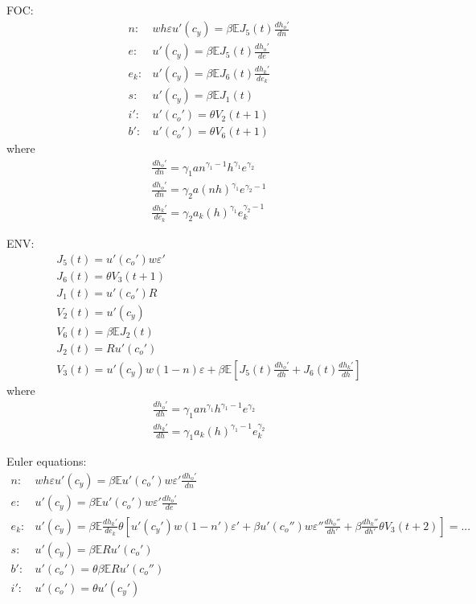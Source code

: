\documentclass{article}
\newcommand{\E}{\mathbb{E}}
\begin{document}
\begin{enumerate}
FOC:
\begin{eqnarray*}
  n:&wh\varepsilon u'(c_y)=\beta\E J_5(t)\frac{dh_o'}{dn}\\
  e:&u'(c_y)=\beta\E J_5(t)\frac{dh_o'}{de}\\
  e_k:&u'(c_y)=\beta\E J_6(t)\frac{dh_k'}{de_k}\\
  s:&u'(c_y)=\beta\E J_1(t)\\
  i':&u'(c_o')=\theta V_2(t+1)\\
  b':&u'(c_o')=\theta V_6(t+1)
\end{eqnarray*}
where
\begin{eqnarray*}
  \frac{dh_o'}{dn}=\gamma_1an^{\gamma_1-1}h^{\gamma_1}e^{\gamma_2}\\
  \frac{dh_o'}{dn}=\gamma_2a(nh)^{\gamma_1}e^{\gamma_2-1}\\
  \frac{dh_k'}{de_k}=\gamma_2a_k(h)^{\gamma_1}e_k^{\gamma_2-1}
\end{eqnarray*}

ENV:
\begin{eqnarray*}
  J_5(t)=u'(c_o')w\varepsilon'\\
  J_6(t)=\theta V_3(t+1)\\
  J_1(t)=u'(c_o')R\\
  V_2(t)=u'(c_y)\\
  V_6(t)=\beta\E J_2(t)\\
  J_2(t)=Ru'(c_o')\\
  V_3(t)=u'(c_y)w(1-n)\varepsilon+\beta\E[J_5(t)\frac{dh_o'}{dh}+J_6(t)\frac{dh_k'}{dh}]
\end{eqnarray*}
where
\begin{eqnarray*}
  \frac{dh_o'}{dh}=\gamma_1an^{\gamma_1}h^{\gamma_1-1}e^{\gamma_2}\\
  \frac{dh_k'}{dh}=\gamma_1a_k(h)^{\gamma_1-1}e_k^{\gamma_2}
\end{eqnarray*}

Euler equations:
\begin{eqnarray*}
  n:&wh\varepsilon u'(c_y)=\beta\E u'(c_o')w\varepsilon'\frac{dh_o'}{dn}\\
  e:&u'(c_y)=\beta\E u'(c_o')w\varepsilon'\frac{dh_o'}{de}\\
  e_k:&u'(c_y)=\beta\E \frac{dh_k'}{de_k}\theta\left[
       u'(c_y')w(1-n')\varepsilon'
       +\beta u'(c_o'')w\varepsilon''\frac{dh_o''}{dh'}
       +\beta \frac{dh_k''}{dh'}\theta V_3(t+2)
       \right]=...\\
  s:&u'(c_y)=\beta \E Ru'(c_o')\\
  b':&u'(c_o')=\theta\beta\E Ru'(c_o'')\\
  i':&u'(c_o')=\theta u'(c_y')
\end{eqnarray*}


\end{enumerate}
\end{document}
